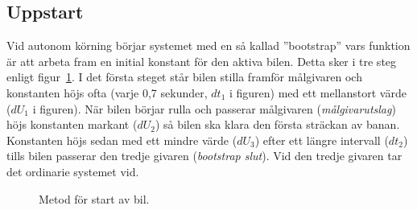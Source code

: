 \subsection{Uppstart} 
\label{sec:systembeskrivning:uppstart}


Vid autonom körning börjar systemet med en så kallad ''bootstrap'' vars funktion
är att arbeta fram en initial konstant för den aktiva bilen. Detta sker i tre
steg enligt figur~\ref{fig:bootstrap}. I det första steget står bilen stilla
framför målgivaren och konstanten höjs ofta (varje 0,7 sekunder, $dt_1$ i
figuren) med ett mellanstort värde ($dU_1$ i figuren). När bilen börjar rulla
och passerar målgivaren (\emph{målgivarutslag}) höjs konstanten markant ($dU_2$)
så bilen ska klara den första sträckan av banan. Konstanten höjs sedan med ett
mindre värde ($dU_3$) efter ett längre intervall ($dt_2$) tills bilen passerar
den tredje givaren (\emph{bootstrap slut}). Vid den tredje givaren tar det
ordinarie systemet vid.

\begin{figure}
	\centering
	\caption{Metod för start av bil.}
	\label{fig:bootstrap}
\end{figure}
